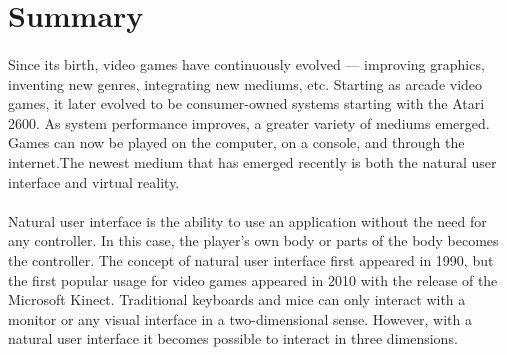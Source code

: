 

\usepackage{float}
\usepackage[hidelinks]{hyperref}

\newcommand{\namesigdate}[2][5cm]{%
	\begin{tabular}{@{}p{#1}@{}}
		#2 \\[\normalbaselineskip] \hrule \\[0pt]
		{\small \textit{Name (Printed)}} \\
		[\normalbaselineskip] \hrule \\[0pt]
		{\small \textit{Signature}}\\
		[\normalbaselineskip] \hrule \\[0pt]
		{\small \textit{Date}}
	\end{tabular}
}



\maketitle

\section{Summary}

\paragraph{} Since its birth, video games have continuously evolved --- improving graphics, inventing new genres, integrating new mediums, etc. Starting as arcade video games, it later evolved to be consumer-owned systems starting with the Atari 2600. As system performance improves, a greater variety of mediums emerged. Games can now be played on the computer, on a console, and through the internet.The newest medium that has emerged recently is both the natural user interface and virtual reality. 

\paragraph{} Natural user interface is the ability to use an application without the need for any controller. In this case, the player’s own body or parts of the body becomes the controller. The concept of natural user interface first appeared in 1990, but the first popular usage for video games appeared in 2010 with the release of the Microsoft Kinect. Traditional keyboards and mice can only interact with a monitor or any visual interface in a two-dimensional sense. However, with a natural user interface it becomes possible to interact in three dimensions. 

